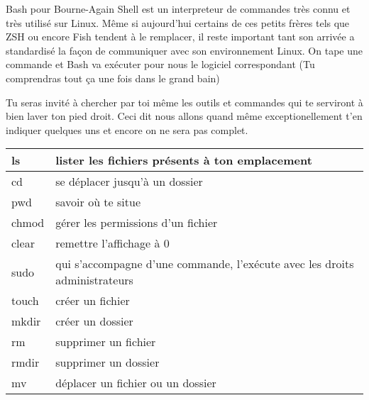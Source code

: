 \documentclass[a4paper, 12pt]{article}
\begin{document}
{\comfortaa

    Bash pour Bourne-Again Shell est un interpreteur de commandes très connu et très utilisé sur Linux. Même si aujourd'hui
    certains de ces petits frères tels que ZSH ou encore Fish tendent à le remplacer, il reste important tant
    son arrivée a standardisé la façon de communiquer avec son environnement Linux.
    \newline \newline
    On tape une commande et Bash va exécuter pour nous le logiciel correspondant
    (Tu comprendras tout ça une fois dans le grand bain)

    \vspace{0.6cm}

    Tu seras invité à chercher par toi même les outils et commandes
    qui te serviront à bien laver ton pied droit. Ceci dit nous allons
    quand même
    \newline
    exceptionellement t'en indiquer quelques uns et encore
    on ne sera pas complet.

    
    \begin{tabular}{|p{2cm}|p{14cm}|} 
        \hline
        ls & lister les fichiers présents à ton emplacement \\
        \hline
        cd & se déplacer jusqu'à un dossier \\
        \hline
        pwd & savoir où te situe \\
        \hline
        chmod & gérer les permissions d'un fichier \\
        \hline
        clear & remettre l'affichage à 0 \\
        \hline
        sudo & qui s'accompagne d'une commande, l'exécute avec les droits administrateurs \\
        \hline
        touch & créer un fichier \\
        \hline
        mkdir & créer un dossier \\
        \hline
        rm & supprimer un fichier \\
        \hline
        rmdir & supprimer un dossier \\
        \hline
        mv & déplacer un fichier ou un dossier \\
        \hline
    \end{tabular}

}
\end{document}
